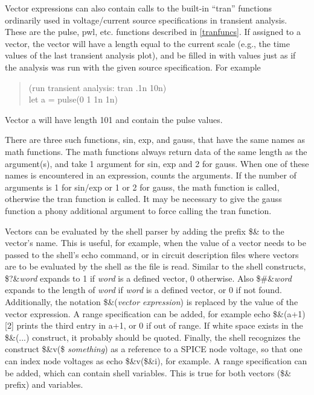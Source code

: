 Vector expressions can also contain calls to the built-in ``tran''
functions ordinarily used in voltage/current source specifications in
transient analysis.  These are the {\vt pulse}, {\vt pwl}, etc. 
functions described in \ref{tranfuncs}.  If assigned to a vector, the
vector will have a length equal to the current scale (e.g., the time
values of the last transient analysis plot), and be filled in with
values just as if the analysis was run with the given source
specification.  For example
\begin{quote}
    (run transient analysis: tran .1n 10n)\\
    {\vt let a = pulse(0 1 1n 1n)}
\end{quote}
Vector {\vt a} will have length 101 and contain the pulse values.

There are three such functions, {\vt sin}, {\vt exp}, and {\vt
gauss}, that have the same names as math functions.  The math
functions always return data of the same length as the argument(s),
and take 1 argument for {\vt sin}, {\vt exp} and 2 for {\vt gauss}. 
When one of these names is encountered in an expression, {\WRspice}
counts the arguments.  If the number of arguments is 1 for {\vt
sin}/{\vt exp} or 1 or 2 for {\vt gauss}, the math function is called,
otherwise the tran function is called.  It may be necessary to give
the {\vt gauss} function a phony additional argument to force calling
the tran function.

Vectors can be evaluated by the shell parser by adding the prefix {\vt
\$\&} to the vector's name.  This is useful, for example, when the
value of a vector needs to be passed to the shell's {\cb echo}
command, or in circuit description files where vectors are to be
evaluated by the shell as the file is read.  Similar to the shell
constructs, {\vt \$?\&{\it word\/}} expands to 1 if {\it word\/} is a
defined vector, 0 otherwise.  Also {\vt \$\#\&{\it word\/}} expands to
the length of {\it word\/} if {\it word\/} is a defined vector, or 0
if not found.  Additionally, the notation {\vt \$\&({\it vector
expression\/})} is replaced by the value of the vector expression.  A
range specification can be added, for example {\vt echo \$\&(a+1)[2]}
prints the third entry in {\vt a+1}, or 0 if out of range.  If white
space exists in the {\vt \$\&(...)} construct, it probably should be
quoted.  Finally, the shell recognizes the construct {\vt \$\&v(\${\it
something\/})} as a reference to a SPICE node voltage, so that one can
index node voltages as {\vt echo \$\&v(\$\&i)}, for example.  A range
specification can be added, which can contain shell variables.  This
is true for both vectors ({\vt \$\&} prefix) and variables.

